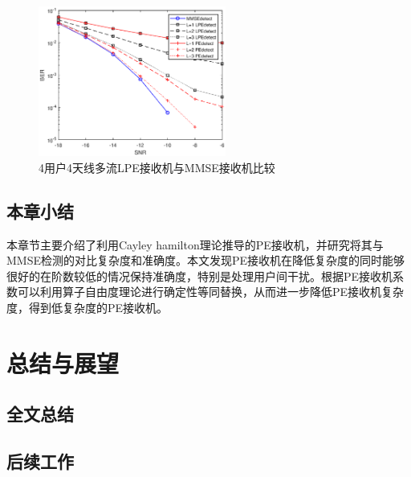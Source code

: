 \documentclass[bachelor,nocolorlinks, printoneside]{seuthesis} %
\begin{document}
\begin{Main}
\begin{figure}[htbp!]
\end{figure}
\begin{figure}[htbp!]
	\centering \includegraphics[width=0.55\textwidth]{img/4_11.eps} \caption{4用户4天线多流LPE接收机与MMSE接收机比较}
\end{figure}
\section{本章小结}
本章节主要介绍了利用Cayley hamilton理论推导的PE接收机，并研究将其与MMSE检测的对比复杂度和准确度。本文发现PE接收机在降低复杂度的同时能够很好的在阶数较低的情况保持准确度，特别是处理用户间干扰。根据PE接收机系数可以利用算子自由度理论进行确定性等同替换，从而进一步降低PE接收机复杂度，得到低复杂度的PE接收机。

\chapter{总结与展望}
\section{全文总结}
\section{后续工作}








\end{Main} %



%



\newpage
\printindex %



%
%

 
\end{document}
